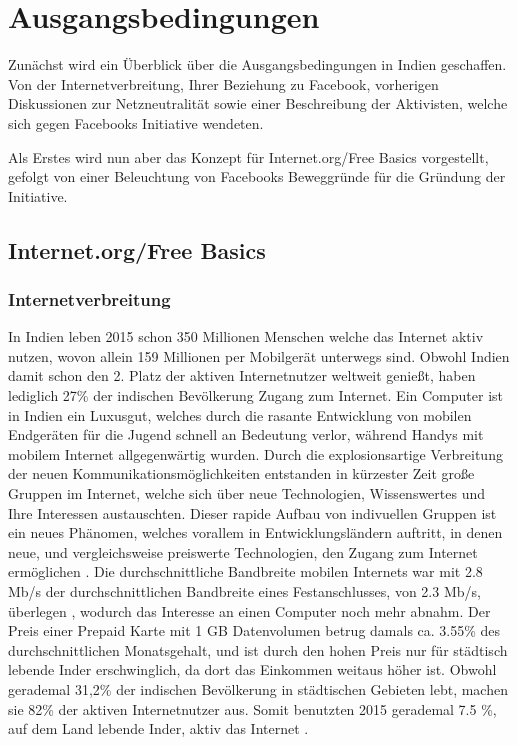 \documentclass{article}
\begin{document}
\section{Ausgangsbedingungen}

Zunächst wird ein Überblick über die Ausgangsbedingungen in Indien geschaffen. Von der Internetverbreitung, Ihrer Beziehung zu Facebook, vorherigen Diskussionen zur Netzneutralität sowie einer Beschreibung der Aktivisten, welche sich gegen Facebooks Initiative wendeten.

Als Erstes wird nun aber das Konzept für Internet.org/Free Basics vorgestellt, gefolgt von einer Beleuchtung von Facebooks Beweggründe für die Gründung der Initiative.

\subsection{Internet.org/Free Basics}

\subsubsection{Internetverbreitung}

In Indien leben 2015 schon 350 Millionen Menschen welche das Internet aktiv nutzen\autocite{slideshareIndia}, wovon allein 159 Millionen per Mobilgerät unterwegs sind.
Obwohl Indien damit schon den 2. Platz der aktiven Internetnutzer weltweit genießt, haben lediglich 27\% der indischen Bevölkerung Zugang zum Internet\autocite{InternetCountry}.
\medskip 
Ein Computer ist in Indien ein Luxusgut, welches durch die rasante Entwicklung von mobilen Endgeräten für die Jugend schnell an Bedeutung verlor, während Handys mit mobilem Internet allgegenwärtig wurden.
Durch die explosionsartige Verbreitung der neuen Kommunikationsmöglichkeiten entstanden in kürzester Zeit große Gruppen im Internet, welche sich über neue Technologien, Wissenswertes und Ihre Interessen austauschten.
Dieser rapide Aufbau von indivuellen Gruppen ist ein neues Phänomen, welches vorallem in Entwicklungsländern auftritt, in denen neue, und vergleichsweise preiswerte Technologien, den Zugang zum Internet ermöglichen \textcite{empowermentThroughFacebook}.
\medskip
Die durchschnittliche Bandbreite mobilen Internets war mit 2.8 Mb/s der durchschnittlichen Bandbreite eines Festanschlusses, von 2.3 Mb/s, überlegen \autocite{slideshareIndia}, wodurch das Interesse an einen Computer noch mehr abnahm.
Der Preis einer Prepaid Karte mit 1 GB Datenvolumen betrug damals ca. 3.55\% des durchschnittlichen Monatsgehalt\autocite{broadbandAgency}, und ist durch den hohen Preis nur für städtisch lebende Inder erschwinglich, da dort das Einkommen weitaus höher ist.
Obwohl gerademal 31,2\% der indischen Bevölkerung in städtischen Gebieten lebt, machen sie 82\% der aktiven Internetnutzer aus\autocite{IndiaBevölkerung}.
Somit benutzten 2015 gerademal 7.5 \%, auf dem Land lebende Inder, aktiv das Internet \autocite{slideshareIndia}.
\end{document}
